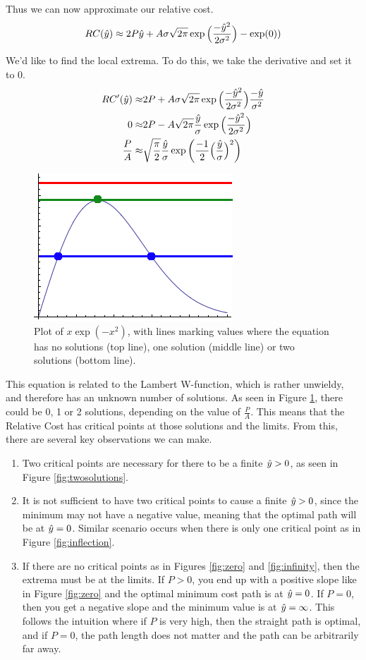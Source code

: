 Thus we can now approximate our relative cost. 
\[
RC(\hat{y}) \approx 2P\hat{y} + A\sigma\sqrt{2\pi} \exp\Big(\frac{-\hat{y}^2}{2\sigma^2}\Big) - \exp(0) ) \\
\]

We'd like to find the local extrema. To do this, we take the derivative and set it to 0. 
\begin{align}
RC'(\hat{y}) \approx& 2P + A\sigma\sqrt{2\pi}             \exp\Big( \frac{-\hat{y}^2}{2\sigma^2} \Big) \frac{-\hat{y}}{\sigma^2}\notag\\
0  \approx& 2P - A\sqrt{2\pi}        \frac{\hat{y}}{\sigma} \exp\Big( \frac{-\hat{y}^2}{2\sigma^2} \Big) \notag\\
  \frac{P}{A} \approx& \sqrt{\frac{\pi}{2}} \frac{\hat{y}}{\sigma} \exp\bigg( \frac{-1}{2} \Big(\frac{\hat{y}}{\sigma} \Big)^2 \bigg) 
\end{align}
\begin{figure}
\centering
\includegraphics[width=0.4\columnwidth]{graphix/lambert.png}
\caption{Plot of $x \exp(-x^2)$, with lines marking values where the equation has no solutions (top line), one solution (middle line) or two solutions (bottom line).}
\label{fig:lambert}
\end{figure}

This equation is related to the Lambert W-function, which is rather unwieldy, and therefore has an unknown number of solutions. As seen in Figure \ref{fig:lambert}, there could be 0, 1 or 2 solutions, depending on the value of $\frac{P}{A}$. This means that the Relative Cost has critical points at those solutions and the limits. From this, there are several key observations we can make. 
\begin{enumerate}
\item Two critical points are necessary for there to be a finite $\hat{y}>0$, as seen in Figure \ref{fig:twosolutions}. 
\item It is not sufficient to have two critical points to cause a finite $\hat{y}>0$, since the minimum may not have a negative value, meaning that the optimal path will be at $\hat{y}=0$. Similar scenario occurs when there is only one critical point as in Figure \ref{fig:inflection}. 
\item If there are no critical points as in Figures \ref{fig:zero} and \ref{fig:infinity}, then the extrema must be at the limits. If $P>0$, you end up with a positive slope like in Figure \ref{fig:zero} and the optimal minimum cost path is at $\hat{y}=0$. If $P=0$, then you get a negative slope and the minimum value is at $\hat{y}=\infty$. This follows the intuition where if $P$ is very high, then the straight path is optimal, and if $P=0$, the path length does not matter and the path can be arbitrarily far away. 
\end{enumerate}


